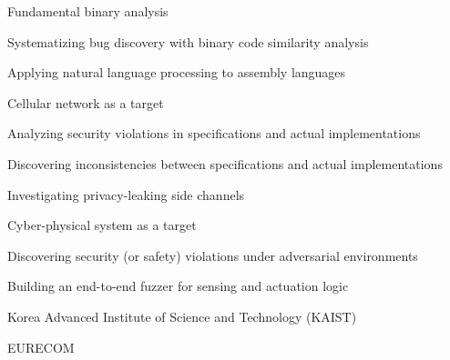 \begin{timeitemize}{Fundamental binary analysis}{}
    \item Systematizing bug discovery with binary code similarity analysis
    \item Applying natural language processing to assembly languages
\end{timeitemize}
\begin{timeitemize}{Cellular network as a target}{}
    \item Analyzing security violations in specifications and actual implementations
    \item Discovering inconsistencies between specifications and actual implementations
    \item Investigating privacy-leaking side channels
\end{timeitemize}
\begin{timeitemize}{Cyber-physical system as a target}{}
    \item Discovering security (or safety) violations under adversarial environments
    \item Building an end-to-end fuzzer for sensing and actuation logic
\end{timeitemize}

\begin{timeitemize}{Korea Advanced Institute of Science and Technology (KAIST)}{}


\end{timeitemize}

\begin{timeitemize}[France]{EURECOM}{}
\end{timeitemize}

